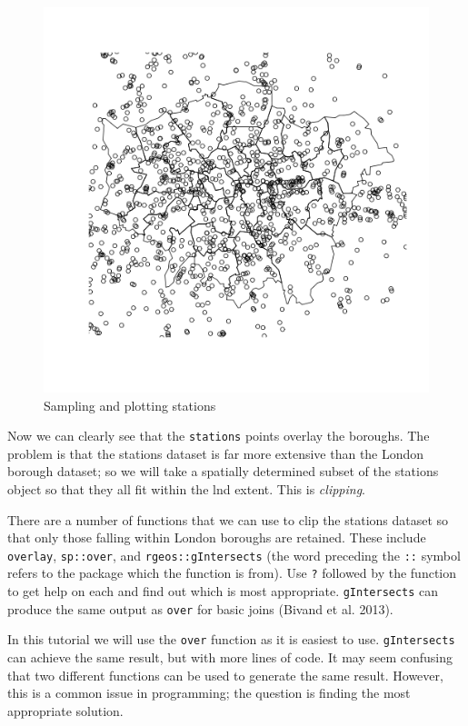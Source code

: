\documentclass[]{article}
\begin{document}
\begin{figure}[htbp]
\centering
\includegraphics{figure/Sampling_and_plotting_stations.png}
\caption{Sampling and plotting stations}
\end{figure}

Now we can clearly see that the \texttt{stations} points overlay the
boroughs. The problem is that the stations dataset is far more extensive
than the London borough dataset; so we will take a spatially determined
subset of the stations object so that they all fit within the lnd
extent. This is \emph{clipping}.

There are a number of functions that we can use to clip the stations
dataset so that only those falling within London boroughs are retained.
These include \texttt{overlay}, \texttt{sp::over}, and
\texttt{rgeos::gIntersects} (the word preceding the \texttt{::} symbol
refers to the package which the function is from). Use \texttt{?}
followed by the function to get help on each and find out which is most
appropriate. \texttt{gIntersects} can produce the same output as
\texttt{over} for basic joins (Bivand et al. 2013).

In this tutorial we will use the \texttt{over} function as it is easiest
to use. \texttt{gIntersects} can achieve the same result, but with more
lines of code. It may seem confusing that two different functions can be
used to generate the same result. However, this is a common issue in
programming; the question is finding the most appropriate solution.
\end{document}
